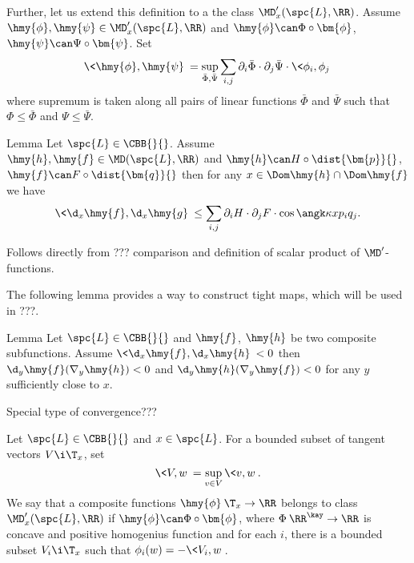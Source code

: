 Further, let us extend this definition to a the class $\MD'_x(\spc{L},\RR)$.
Assume $\hmy{\phi},\hmy{\psi}\in\MD_x'(\spc{L},\RR)$ and
$\hmy{\phi}\can\Phi\circ\bm{\phi}$,
$\hmy{\psi}\can\Psi\circ\bm{\psi}$.
Set
$$\<\hmy{\phi},\hmy{\psi}\>
=
\sup_{\bar\Phi,\bar\Psi}
\sum_{i,j}
\partial_i\bar\Phi
\cdot
\partial_j\bar\Psi
\cdot
\<\phi_i,\phi_j\>$$
where supremum is taken along all pairs of linear functions $\bar\Phi$ and $\bar\Psi$  such that $\Phi\le \bar\Phi$ and $\Psi\le\bar\Psi$.

\begin{thm}{Lemma}
Let $\spc{L}\in\CBB{}{}$.
Assume $\hmy{h},\hmy{f}\in\MD(\spc{L},\RR)$ 
and $\hmy{h}\can H\circ\dist{\bm{p}}{}$, $\hmy{f}\can F\circ\dist{\bm{q}}{}$
then for any $x\in\Dom\hmy{h}\cap\Dom\hmy{f}$ we have 
$$\<\d_x\hmy{f},\d_x\hmy{g}\>\le \sum_{i,j}\partial_iH\cdot\partial_jF\cdot\cos\angk\kappa x{p_i}{q_j}.$$

\end{thm}

Follows directly from ??? comparison and definition of scalar product of $\MD'$-functions.
\qeds

The following lemma provides a way to construct tight maps, which will be used in ???.


\begin{thm}{Lemma}\label{lem:comp>tight}
Let $\spc{L}\in \CBB{}{}$ and $\hmy{f}$, $\hmy{h}$ be two composite subfunctions. 
Assume $\<\d_x\hmy{f},\d_x\hmy{h}\><0$ then 
$\d_y\hmy{f}(\nabla_y\hmy{h})<0$ and $\d_y\hmy{h}(\nabla_y\hmy{f})<0$ for any $y$ sufficiently close to $x$.
\end{thm}

Special type of convergence???

















Let $\spc{L}\in\CBB{}{}$ and $x\in \spc{L}$.
For a bounded subset of tangent vectors $V\i \T_x$,
set $$\<V,w\>=\sup_{v\in V}\<v,w\>.$$
We say that a composite functions $\hmy{\phi}\:\T_x\to\RR$ belongs to class $\MD_x'(\spc{L},\RR)$ if 
$\hmy{\phi}\can\Phi\circ\bm{\phi}$, where $\Phi\:\RR^\kay\to\RR$ is concave and positive homogenius function 
and for each $i$,
there is a bounded subset $V_i\i\T_x$ 
such that $\phi_i(w)=-\<V_i,w\>$.

